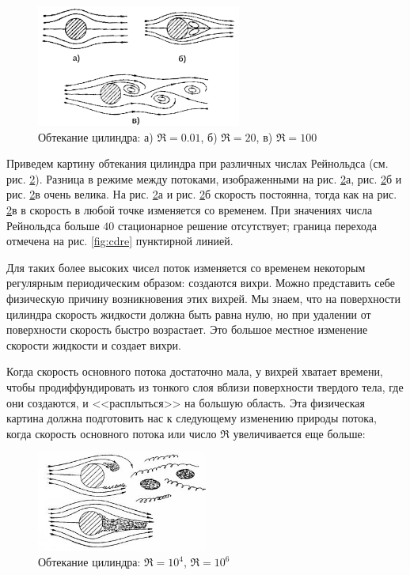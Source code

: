\begin{figure}[H]
	\centering
	\includegraphics[width=0.6\textwidth]{img/small_Re.png}
	\caption{Обтекание цилиндра: а) $\Re=0.01$, б) $\Re=20$, в) $\Re=100$}
	\label{fig:small_Re}
\end{figure}
Приведем картину обтекания цилиндра при различных числах Рейнольдса (см. рис. \ref{fig:small_Re}). Разница в режиме между потоками, изображенными на  рис. \ref{fig:small_Re}а, рис. \ref{fig:small_Re}б и рис. \ref{fig:small_Re}в очень велика. На рис. \ref{fig:small_Re}а и рис. \ref{fig:small_Re}б скорость постоянна, тогда как на  рис. \ref{fig:small_Re}в в скорость в любой точке изменяется со временем. При значениях числа Рейнольдса больше $40$ стационарное решение отсутствует; граница перехода отмечена на рис. \ref{fig:cdre} пунктирной линией. 

Для таких более высоких чисел поток изменяется со временем некоторым регулярным периодическим образом: создаются вихри. Можно представить себе физическую причину возникновения этих вихрей. Мы знаем, что на поверхности цилиндра скорость жидкости должна быть равна нулю, но при удалении от поверхности скорость быстро возрастает. Это большое местное изменение скорости жидкости и создает вихри. 

Когда скорость основного потока достаточно мала, у вихрей хватает времени, чтобы продиффундировать из тонкого слоя вблизи поверхности твердого тела, где они создаются, и <<расплыться>> на большую область. Эта физическая картина должна подготовить нас к следующему изменению природы потока, когда скорость основного потока или число $\Re$ увеличивается еще больше:
\begin{figure}[H]
	\centering
	\includegraphics[width=0.5\textwidth]{img/big_Re.png}
	\caption{Обтекание цилиндра: $\Re=10^4$, $\Re=10^6$}
	\label{fig:small_Re}
\end{figure}


